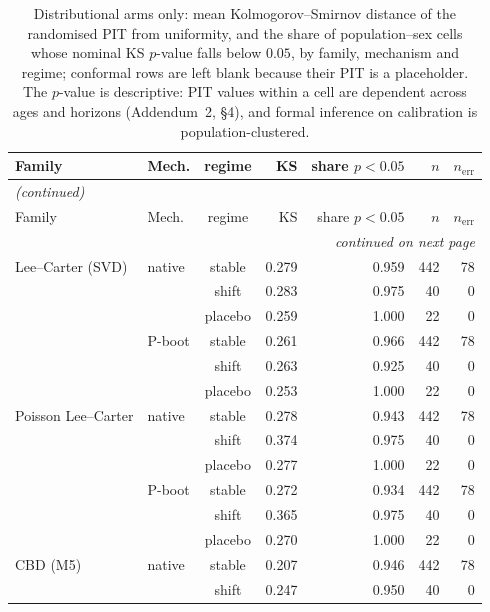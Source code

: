 {\footnotesize\setlength{\tabcolsep}{2.5pt}
\begin{longtable}{@{}llcrrrr@{}}
\caption{Distributional arms only: mean Kolmogorov--Smirnov distance of the randomised PIT from uniformity, and the share of population--sex cells whose nominal KS $p$-value falls below $0.05$, by family, mechanism and regime; conformal rows are left blank because their PIT is a placeholder. The $p$-value is descriptive: PIT values within a cell are dependent across ages and horizons (Addendum~2, \S4), and formal inference on calibration is population-clustered.}\label{tab:pit} \\
\toprule
Family & Mech. & regime & KS & share $p<0.05$ & $n$ & $n_{\mathrm{err}}$ \\
\midrule
\endfirsthead
\multicolumn{7}{l}{\emph{(continued)}} \\
\toprule
Family & Mech. & regime & KS & share $p<0.05$ & $n$ & $n_{\mathrm{err}}$ \\
\midrule
\endhead
\midrule \multicolumn{7}{r}{\emph{continued on next page}} \\
\endfoot
\bottomrule
\endlastfoot
Lee--Carter (SVD) & native & stable & 0.279 & 0.959 & 442 & 78 \\
 &  & shift & 0.283 & 0.975 & 40 & 0 \\
 &  & placebo & 0.259 & 1.000 & 22 & 0 \\
 & P-boot & stable & 0.261 & 0.966 & 442 & 78 \\
 &  & shift & 0.263 & 0.925 & 40 & 0 \\
 &  & placebo & 0.253 & 1.000 & 22 & 0 \\
\addlinespace[2pt]
Poisson Lee--Carter & native & stable & 0.278 & 0.943 & 442 & 78 \\
 &  & shift & 0.374 & 0.975 & 40 & 0 \\
 &  & placebo & 0.277 & 1.000 & 22 & 0 \\
 & P-boot & stable & 0.272 & 0.934 & 442 & 78 \\
 &  & shift & 0.365 & 0.975 & 40 & 0 \\
 &  & placebo & 0.270 & 1.000 & 22 & 0 \\
\addlinespace[2pt]
CBD (M5) & native & stable & 0.207 & 0.946 & 442 & 78 \\
 &  & shift & 0.247 & 0.950 & 40 & 0 \\

\end{longtable}}
